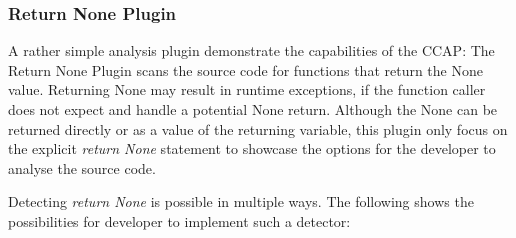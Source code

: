 \subsubsection{Return None Plugin}
A rather simple analysis plugin demonstrate the capabilities of the CCAP: The Return None Plugin scans the source code for functions that return the None value. Returning None may result in runtime exceptions, if the function caller does not expect and handle a potential None return. Although the None can be returned directly or as a value of the returning variable, this plugin only focus on the explicit \textit{return None} statement to showcase the options for the developer to analyse the source code.

Detecting \textit{return None} is possible in multiple ways. The following shows the possibilities for developer to implement such a detector:
